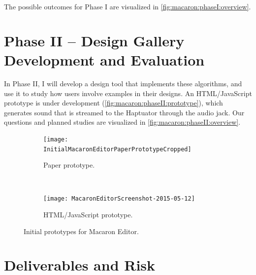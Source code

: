 The possible outcomes for Phase I are visualized in \autoref{fig:macaron:phaseI:overview}.



\section{Phase II -- Design Gallery Development and Evaluation}
In Phase II, I will develop a design tool that implements these algorithms, and use it to study how users involve examples in their designs.
An HTML/JavaScript prototype is under development (\autoref{fig:macaron:phaseII:prototype}), which generates sound that is streamed to the Haptuator through the audio jack.
Our questions and planned studies are visualized in \autoref{fig:macaron:phaseII:overview}.

\begin{figure}[h]
\centering
 \begin{subfigure}[t]{0.4\textwidth}
	\begin{center}
	\texttt{[image: InitialMacaronEditorPaperPrototypeCropped]}
	\caption{Paper prototype.}
	\label{fig:macaron:phaseII:prototype:paper}
	\end{center}
    \end{subfigure}
 ~
 \begin{subfigure}[t]{0.4\textwidth}
	\begin{center}
	\texttt{[image: MacaronEditorScreenshot-2015-05-12]}
	\caption{HTML/JavaScript prototype.}
	\label{fig:macaron:phaseII:prototype:html}
	\end{center}
    \end{subfigure}
	
	\caption{Initial prototypes for Macaron Editor.}
	\label{fig:macaron:phaseII:prototype}

\end{figure}




\section{Deliverables and Risk}


